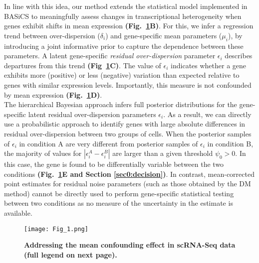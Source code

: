 In line with this idea, our method extends the statistical model implemented in BASiCS \citep{Vallejos2015BASiCS, Vallejos2016} to meaningfully assess changes in transcriptional heterogeneity when genes exhibit shifts in mean expression \textbf{(Fig.~\ref{fig2:Schematic_model}B)}. 
For this, we infer a regression trend between over-dispersion ($\delta_i$) and gene-specific mean parameters ($\mu_i$), by introducing a joint informative prior to capture the dependence between these parameters. 
A latent gene-specific \textit{residual over-dispersion} parameter $\epsilon_i$ describes departures from this trend \textbf{(Fig~\ref{fig2:Schematic_model}C)}. 
The value of $\epsilon_i$ indicates whether a gene exhibits more (positive) or less (negative) variation than expected relative to genes with similar expression levels. 
Importantly, this measure is not confounded by mean expression \textbf{(Fig.~\ref{fig2:Schematic_model}D)}. \\

The hierarchical Bayesian approach infers full posterior distributions for the gene-specific latent residual over-dispersion parameters $\epsilon_i$. 
As a result, we can directly use a probabilistic approach to identify genes with large absolute differences in residual over-dispersion between two groups of cells. 
When the posterior samples of $\epsilon_i$ in condition A are very different from posterior samples of $\epsilon_i$ in condition B, the majority of values for $|\epsilon_i^A - \epsilon_i^B|$ are larger than a given threshold $\psi_0>0$. 
In this case, the gene is found to be differentially variable between the two conditions  \textbf{(Fig.~\ref{fig2:Schematic_model}E and Section \ref{sec0:decision})}. 
In contrast, mean-corrected point estimates for residual noise parameters (such as those obtained by the DM method) cannot be directly used to perform gene-specific statistical testing between two conditions as no measure of the uncertainty in the estimate is available.\\

\newpage

\begin{figure}[!h]
\centering
\texttt{[image: Fig\_1.png]}
\caption[Addressing the mean confounding effect in scRNA-Seq data]{\textbf{Addressing the mean confounding effect in scRNA-Seq data (full legend on next page).}\\}
\label{fig2:Schematic_model}
\end{figure}

\newpage


